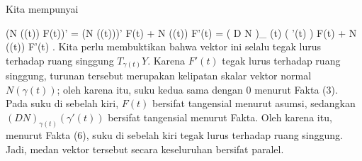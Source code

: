 Kita mempunyai

\mavergleichskettealign
{\vergleichskettealign
{ (N (\gamma(t)) \times F(t))'
}
{ =} { (N (\gamma(t)))' \times F(t) +  N (\gamma(t)) \times F'(t)
}
{ =} { \left(  D N   \right)_{ \gamma(t)} \left(   \gamma'(t)   \right)  \times F(t) +  N (\gamma(t)) \times F'(t)
}
{ } {
}
{ } {
}
}
{}
{}{.}
Kita perlu membuktikan bahwa vektor ini selalu tegak lurus terhadap ruang singgung $T_{\gamma(t)}Y$. Karena $F'(t)$ tegak lurus terhadap ruang singgung, turunan tersebut merupakan kelipatan skalar vektor normal $N(\gamma(t))$; oleh karena itu, suku kedua sama dengan $0$ menurut
Fakta (3).
Pada suku di sebelah kiri, $F(t)$ bersifat tangensial menurut asumsi, sedangkan $\left(  D N   \right)_{ \gamma(t)} \left(   \gamma'(t)   \right)$ bersifat tangensial menurut
Fakta.
Oleh karena itu, menurut
Fakta (6),
suku di sebelah kiri tegak lurus terhadap ruang singgung. Jadi, medan vektor tersebut secara keseluruhan bersifat paralel.
